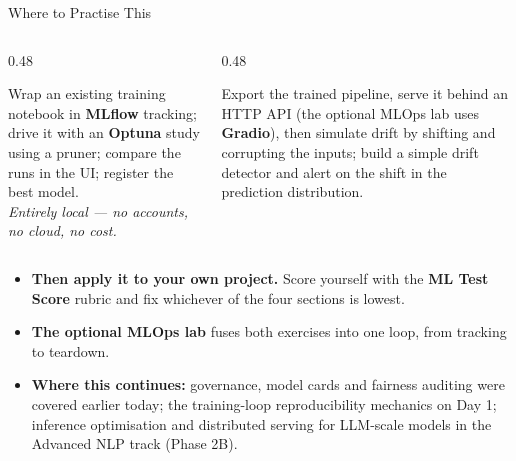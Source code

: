 \begin{frame}{Where to Practise This}

    \begin{columns}[T]
        \begin{column}{0.48\textwidth}
            \begin{tcolorbox}[colback=gray!8, colframe=gray!60, title=\small Exercise 1 --- Tracking and tuning]
                \small
                Wrap an existing training notebook in \textbf{MLflow} tracking; drive it with an
                \textbf{Optuna} study using a pruner; compare the runs in the UI; register the best model.
                \vspace{0.3em}
                \\ \textit{Entirely local --- no accounts, no cloud, no cost.}
            \end{tcolorbox}
        \end{column}
        \begin{column}{0.48\textwidth}
            \begin{tcolorbox}[colback=gray!8, colframe=gray!60, title=\small Exercise 2 --- Serving and drift]
                \small
                Export the trained pipeline, serve it behind an HTTP API (the optional MLOps lab uses \textbf{Gradio}), then simulate drift by shifting
                and corrupting the inputs; build a simple drift detector and alert on the shift in the
                prediction distribution.
            \end{tcolorbox}
        \end{column}
    \end{columns}

    \vspace{0.6em}
    \begin{itemize}
        \item \textbf{Then apply it to your own project.} Score yourself with the \textbf{ML Test Score}
              rubric and fix whichever of the four sections is lowest.
        \item \textbf{The optional MLOps lab} fuses both exercises into one loop, from tracking to teardown.
        \item \textbf{Where this continues:} governance, model cards and fairness auditing were covered
              earlier today; the training-loop reproducibility mechanics on Day 1; inference
              optimisation and distributed serving for LLM-scale models in the Advanced NLP track
              (Phase 2B).
    \end{itemize}

\end{frame}
